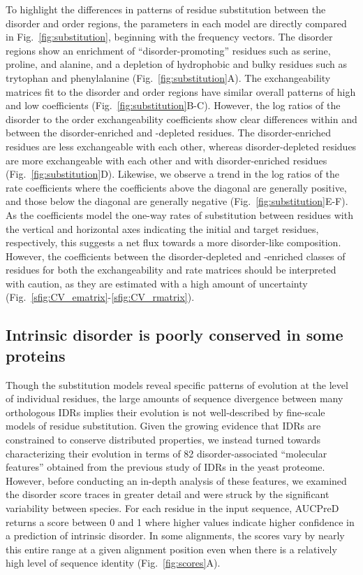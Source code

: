 To highlight the differences in patterns of residue substitution between the disorder and order regions, the parameters in each model are directly compared in Fig.~\ref{fig:substitution}, beginning with the frequency vectors. The disorder regions show an enrichment of ``disorder-promoting'' residues such as serine, proline, and alanine, and a depletion of hydrophobic and bulky residues such as trytophan and phenylalanine (Fig.~\ref{fig:substitution}A). The exchangeability matrices fit to the disorder and order regions have similar overall patterns of high and low coefficients (Fig.~\ref{fig:substitution}B-C). However, the log ratios of the disorder to the order exchangeability coefficients show clear differences within and between the disorder-enriched and -depleted residues. The disorder-enriched residues are less exchangeable with each other, whereas disorder-depleted residues are more exchangeable with each other and with disorder-enriched residues (Fig.~\ref{fig:substitution}D). Likewise, we observe a trend in the log ratios of the rate coefficients where the coefficients above the diagonal are generally positive, and those below the diagonal are generally negative (Fig.~\ref{fig:substitution}E-F). As the coefficients model the one-way rates of substitution between residues with the vertical and horizontal axes indicating the initial and target residues, respectively, this suggests a net flux towards a more disorder-like composition. However, the coefficients between the disorder-depleted and -enriched classes of residues for both the exchangeability and rate matrices should be interpreted with caution, as they are estimated with a high amount of uncertainty (Fig.~\ref{sfig:CV_ematrix}-\ref{sfig:CV_rmatrix}).

\subsection{Intrinsic disorder is poorly conserved in some proteins}
Though the substitution models reveal specific patterns of evolution at the level of individual residues, the large amounts of sequence divergence between many orthologous IDRs implies their evolution is not well-described by fine-scale models of residue substitution. Given the growing evidence that IDRs are constrained to conserve distributed properties, we instead turned towards characterizing their evolution in terms of 82 disorder-associated ``molecular features'' obtained from the previous study of IDRs in the yeast proteome. However, before conducting an in-depth analysis of these features, we examined the disorder score traces in greater detail and were struck by the significant variability between species. For each residue in the input sequence, AUCPreD returns a score between 0 and 1 where higher values indicate higher confidence in a prediction of intrinsic disorder. In some alignments, the scores vary by nearly this entire range at a given alignment position even when there is a relatively high level of sequence identity (Fig.~\ref{fig:scores}A).

